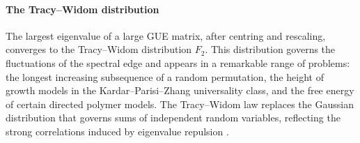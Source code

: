\paragraph{The Tracy--Widom distribution}
The largest eigenvalue of a large GUE matrix, after centring and rescaling,
converges to the Tracy--Widom distribution $F_2$. This distribution governs
the fluctuations of the spectral edge and appears in a remarkable range of
problems: the longest increasing subsequence of a random permutation, the
height of growth models in the Kardar--Parisi--Zhang universality class, and
the free energy of certain directed polymer models. The Tracy--Widom law
replaces the Gaussian distribution that governs sums of independent random
variables, reflecting the strong correlations induced by eigenvalue
repulsion \cite{random_matrix_theory_ref1,random_matrix_theory_ref2}.

